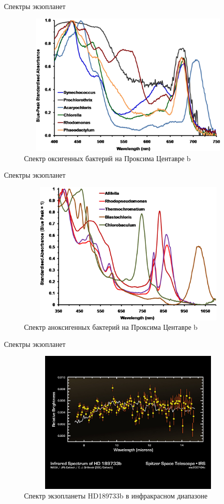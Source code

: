\documentclass[
]{beamer}
\begin{document}
	\begin{frame}{Спектры экзопланет}
		\begin{figure}[H]
			\centering
			\includegraphics[width=11cm, height=7cm]{proxima_b6.jpeg}
			\caption{Спектр оксигенных бактерий на Проксима Центавре b}
		\end{figure}
	\end{frame}

	\begin{frame}{Спектры экзопланет}
		\begin{figure}[H]
			\centering
			\includegraphics[width=11cm, height=7cm]{proxima_b.jpeg}
			\caption{Спектр аноксигенных бактерий на Проксима Центавре b}
		\end{figure}
	\end{frame}

	\begin{frame}{Спектры экзопланет}
		\begin{figure}[H]
			\centering
			\includegraphics[width=11cm, height=7cm]{Ssc2007-04c.jpg}
			\caption{Спектр экзопланеты HD189733b в инфракрасном диапазоне}
		\end{figure}
	\end{frame}
\end{document}
